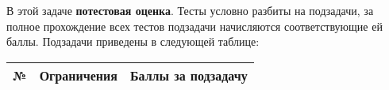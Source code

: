 \begin{problem}{}{\ProblemInputFile}{\ProblemOutputFile}{\ProblemTimeLimit}{\ProblemMemoryLimit}

%


\InputFile

\OutputFile

\Examples

\begin{example}
\exmp{
}{
}%
\end{example}

\Notes

\Scoring

В этой задаче \textbf{потестовая оценка}. Тесты условно разбиты на подзадачи, за полное прохождение всех тестов подзадачи начисляются соответствующие ей баллы. Подзадачи приведены в следующей таблице:

\medskip

\begin{tabular}{| c | c | c |} \hline
	№ & Ограничения & Баллы за подзадачу \\ \hline
\end{tabular}

\end{problem}

